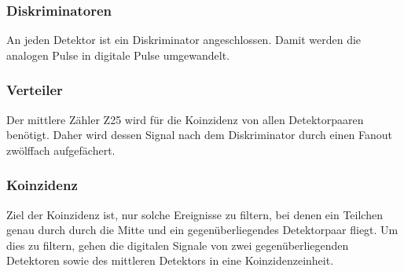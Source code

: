 \documentclass[11pt, ngerman, fleqn, DIV=15, headinclude, BCOR=2cm]{scrreprt}
\begin{document}
\subsubsection{Diskriminatoren}

An jeden Detektor ist ein Diskriminator angeschlossen. Damit werden die
analogen Pulse in digitale Pulse umgewandelt.

\subsubsection{Verteiler}

Der mittlere Zähler Z25 wird für die Koinzidenz von allen Detektorpaaren
benötigt. Daher wird dessen Signal nach dem Diskriminator durch einen Fanout
zwölffach aufgefächert.

\subsubsection{Koinzidenz}

Ziel der Koinzidenz ist, nur solche Ereignisse zu filtern, bei denen ein
Teilchen genau durch durch die Mitte und ein gegenüberliegendes Detektorpaar
fliegt. Um dies zu filtern, gehen die digitalen Signale von zwei
gegenüberliegenden Detektoren sowie des mittleren Detektors in eine
Koinzidenzeinheit.
\end{document}
